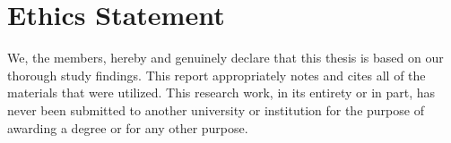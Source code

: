 \section*{Ethics Statement}
We, the members, hereby and genuinely declare that this thesis is based on our thorough study findings. This report appropriately notes and cites all of the materials that were utilized. This research work, in its entirety or in part, has never been submitted to another university or institution for the purpose of awarding a degree or for any other purpose.
\pagebreak